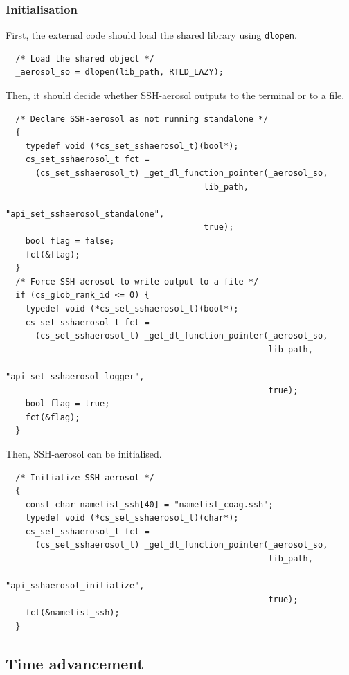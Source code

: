 \documentclass[a4paper,11pt]{article}
\begin{document}
\subsubsection*{Initialisation}

First, the external code should load the shared library using \texttt{dlopen}.
\begin{verbatim}
  /* Load the shared object */
  _aerosol_so = dlopen(lib_path, RTLD_LAZY);
\end{verbatim}

Then, it should decide whether SSH-aerosol outputs to the terminal or to a file.
\begin{verbatim}
  /* Declare SSH-aerosol as not running standalone */
  {
    typedef void (*cs_set_sshaerosol_t)(bool*);
    cs_set_sshaerosol_t fct =
      (cs_set_sshaerosol_t) _get_dl_function_pointer(_aerosol_so,
                                        lib_path,
                                        "api_set_sshaerosol_standalone",
                                        true);
    bool flag = false;
    fct(&flag);
  }
  /* Force SSH-aerosol to write output to a file */
  if (cs_glob_rank_id <= 0) {
    typedef void (*cs_set_sshaerosol_t)(bool*);
    cs_set_sshaerosol_t fct =
      (cs_set_sshaerosol_t) _get_dl_function_pointer(_aerosol_so,
                                                     lib_path,
                                                    "api_set_sshaerosol_logger",
                                                     true);
    bool flag = true;
    fct(&flag);
  }
\end{verbatim}

Then, SSH-aerosol can be initialised.
\begin{verbatim}
  /* Initialize SSH-aerosol */
  {
    const char namelist_ssh[40] = "namelist_coag.ssh";
    typedef void (*cs_set_sshaerosol_t)(char*);
    cs_set_sshaerosol_t fct =
      (cs_set_sshaerosol_t) _get_dl_function_pointer(_aerosol_so,
                                                     lib_path,
                                                    "api_sshaerosol_initialize",
                                                     true);
    fct(&namelist_ssh);
  }
\end{verbatim}

\subsection*{Time advancement}
\end{document}
